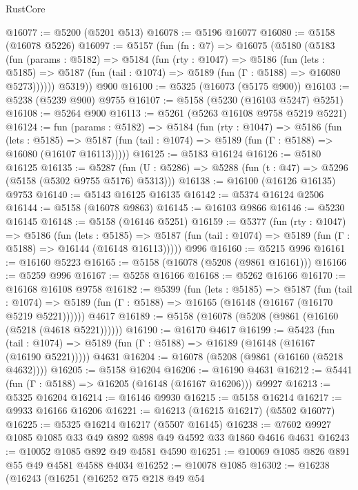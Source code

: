 \begin{lexlean}{RustCore}
\begin{coremodule}
@16077 := @5200 (@5201 @513)
@16078 := @5196 @16077
@16080 := @5158 (@16078 @5226)
@16097 := @5157
    (fun (fn : @7) =>
    @16075
      (@5180
        (@5183
          (fun (params : @5182) =>
          @5184
            (fun (rty : @1047) =>
            @5186
              (fun (lets : @5185) =>
              @5187 (fun (tail : @1074) => @5189 (fun (Γ : @5188) => @16080 @5273))))))
        @5319))
    @900
@16100 := @5325 (@16073 (@5175 @900))
@16103 := @5238 (@5239 @900) @9755
@16107 := @5158 (@5230 (@16103 @5247) @5251)
@16108 := @5264 @900
@16113 := @5261 (@5263 @16108 @9758 @5219 @5221)
@16124 := fun (params : @5182) =>
  @5184
    (fun (rty : @1047) =>
    @5186
      (fun (lets : @5185) =>
      @5187 (fun (tail : @1074) => @5189 (fun (Γ : @5188) => @16080 (@16107 @16113)))))
@16125 := @5183 @16124
@16126 := @5180 @16125
@16135 := @5287
    (fun (U : @5286) => @5288 (fun (t : @47) => @5296 (@5158 (@5302 @9755 @5176) @5313)))
@16138 := @16100 (@16126 @16135) @9753
@16140 := @5143 @16125 @16135
@16142 := @5374 @16124 @2506
@16144 := @5158 (@16078 @9863)
@16145 := @16103 @9866
@16146 := @5230 @16145
@16148 := @5158 (@16146 @5251)
@16159 := @5377
    (fun (rty : @1047) =>
    @5186
      (fun (lets : @5185) =>
      @5187 (fun (tail : @1074) => @5189 (fun (Γ : @5188) => @16144 (@16148 @16113)))))
    @996
@16160 := @5215 @996
@16161 := @16160 @5223
@16165 := @5158 (@16078 (@5208 (@9861 @16161)))
@16166 := @5259 @996
@16167 := @5258 @16166
@16168 := @5262 @16166
@16170 := @16168 @16108 @9758
@16182 := @5399
    (fun (lets : @5185) =>
    @5187
      (fun (tail : @1074) =>
      @5189 (fun (Γ : @5188) => @16165 (@16148 (@16167 (@16170 @5219 @5221))))))
    @4617
@16189 := @5158 (@16078 (@5208 (@9861 (@16160 (@5218 (@4618 @5221))))))
@16190 := @16170 @4617
@16199 := @5423
    (fun (tail : @1074) => @5189 (fun (Γ : @5188) => @16189 (@16148 (@16167 (@16190 @5221)))))
    @4631
@16204 := @16078 (@5208 (@9861 (@16160 (@5218 @4632))))
@16205 := @5158 @16204
@16206 := @16190 @4631
@16212 := @5441 (fun (Γ : @5188) => @16205 (@16148 (@16167 @16206))) @9927
@16213 := @5325 @16204
@16214 := @16146 @9930
@16215 := @5158 @16214
@16217 := @9933 @16166 @16206
@16221 := @16213 (@16215 @16217) (@5502 @16077)
@16225 := @5325 @16214 @16217 (@5507 @16145)
@16238 := @7602 @9927 @1085 @1085 @33 @49 @892 @898 @49 @4592 @33 @1860 @4616 @4631
@16243 := @10052 @1085 @892 @49 @4581 @4590
@16251 := @10069 @1085 @826 @891 @55 @49 @4581 @4588 @4034
@16252 := @10078 @1085
@16302 := @16238
    (@16243
      (@16251
        (@16252
          @75
          @218
          @49
          @54

\end{coremodule}
\end{lexlean}

